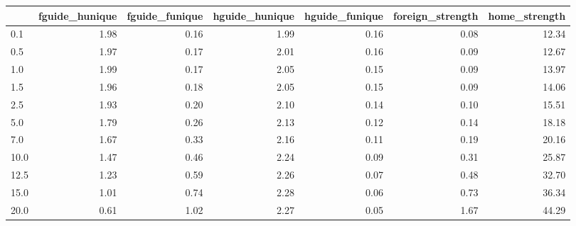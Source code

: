 \begin{tabular}{lrrrrrr}
\toprule
 & fguide_hunique & fguide_funique & hguide_hunique & hguide_funique & foreign_strength & home_strength \\
\midrule
0.1 & 1.98 & 0.16 & 1.99 & 0.16 & 0.08 & 12.34 \\
0.5 & 1.97 & 0.17 & 2.01 & 0.16 & 0.09 & 12.67 \\
1.0 & 1.99 & 0.17 & 2.05 & 0.15 & 0.09 & 13.97 \\
1.5 & 1.96 & 0.18 & 2.05 & 0.15 & 0.09 & 14.06 \\
2.5 & 1.93 & 0.20 & 2.10 & 0.14 & 0.10 & 15.51 \\
5.0 & 1.79 & 0.26 & 2.13 & 0.12 & 0.14 & 18.18 \\
7.0 & 1.67 & 0.33 & 2.16 & 0.11 & 0.19 & 20.16 \\
10.0 & 1.47 & 0.46 & 2.24 & 0.09 & 0.31 & 25.87 \\
12.5 & 1.23 & 0.59 & 2.26 & 0.07 & 0.48 & 32.70 \\
15.0 & 1.01 & 0.74 & 2.28 & 0.06 & 0.73 & 36.34 \\
20.0 & 0.61 & 1.02 & 2.27 & 0.05 & 1.67 & 44.29 \\
\bottomrule
\end{tabular}
